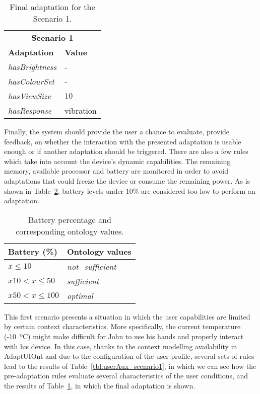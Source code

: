 \begin{table}
 \caption{Final adaptation for the Scenario 1.}
 \label{tbl:final_adaptation_scenario1}
 \footnotesize
 \centering
\begin{tabular}{l l}
  \hline 
  \multicolumn{2}{c}{\textbf{Scenario 1}}\\	
  \textbf{Adaptation} 	& \textbf{Value}\\ 
  \hline
  \textit{hasBrightness}& -		\\
  \textit{hasColourSet}	& -		\\
  \textit{hasViewSize}	& $10$		\\
  \textit{hasResponse}	& vibration	\\
  \hline
\end{tabular}
\end{table}

Finally, the system should provide the user a chance to evaluate, provide 
feedback, on whether the interaction with the presented adaptation is usable 
enough or if another adaptation should be triggered. There are also a few rules 
which take into account the device’s dynamic capabilities. The remaining 
memory, available processor and battery are monitored in order to avoid 
adaptations that could freeze the device or consume the remaining power. As is 
shown in Table~\ref{tbl:battery}, battery levels under $10$\% are considered too 
low to perform an adaptation.

\begin{table}
 \caption{Battery percentage and corresponding ontology values.}
 \label{tbl:battery}
 \footnotesize
 \centering
\begin{tabular}{l l}
  \hline 
  \textbf{Battery (\%)} & \textbf{Ontology values}	\\
  \hline
  $ x \leq 10 $		& \textit{not\_sufficient}	\\
  $ x 10 < x \leq 50 $	& \textit{sufficient} 		\\
  $ x 50 < x \leq 100 $	& \textit{optimal}		\\
  \hline
\end{tabular}
\end{table}

\label{sec:scenario1_discussion}

This first scenario presents a situation in which the user capabilities are
limited by certain context characteristics. More specifically, the current
temperature (-10~ºC) might make difficult for John to use his hands and properly
interact with his device. In this case, thanks to the context modelling 
availability in AdaptUIOnt and due to the configuration of the user profile, 
several sets of rules lead to the results of Table~\ref{tbl:userAux_scenario1},
in which we can see how the pre-adaptation rules evaluate several 
characteristics of the user conditions, and the results of 
Table~\ref{tbl:final_adaptation_scenario1}, in which the final adaptation is 
shown.

